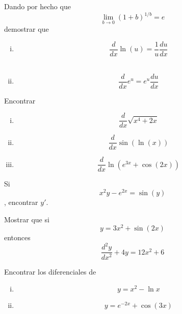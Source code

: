 {}
\begin{problema}
  Dando por hecho que \[\lim_{b\to 0}\left( 1+b \right)^{1/b}=e\] demostrar que 
  \begin{enumerate}[(i)]
    \item \[\dfrac{d}{dx}\ln(u)=\dfrac{1}{u}\dfrac{du}{dx}\] \\
    
    \item \[\dfrac{d}{dx}e^{u}= e^{u}\dfrac{du}{dx}\]
\end{enumerate}
\end{problema}


{}
  \begin{problema}
   Encontrar
   \begin{enumerate}[(i)]
     \item \[\dfrac{d}{dx}\sqrt{x^{4}+2x}\] 
     
     \item \[\dfrac{d}{dx}\sin\left( \ln(x) \right)\]
     
     \item \[\dfrac{d}{dx}\ln\left( e^{3x}+ \cos\left( 2x \right) \right)\]
\end{enumerate}
  \end{problema}


{}
  \begin{problema}
   Si \[x^{2}y-e^{2x}=\sin(y)\], encontrar $y'$.
  \end{problema}


{}
  \begin{problema}
   Mostrar que si \[y=3x^{2}+\sin(2x)\] entonces
   \[\dfrac{d^{2}y}{dx^{2}}+4y=12x^{2}+6\]
  \end{problema}


{}
  \begin{problema}
   Encontrar los diferenciales de 
   \begin{enumerate}[(i)]
     \item \[y=x^{2}-\ln x\] 
     
     \item \[y = e^{-2x}+\cos(3x)\]
\end{enumerate}
  \end{problema}



